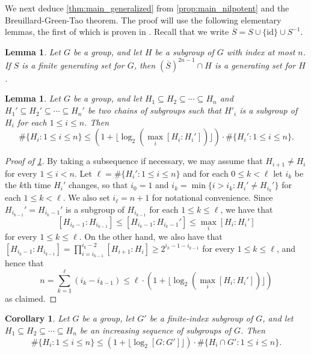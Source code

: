 \documentclass[11pt]{article}
\numberwithin{equation}{section}
\theoremstyle{plain}
\newtheorem{lemma}[thm]{Lemma}
\newtheorem{corollary}[thm]{Corollary}
\theoremstyle{definition}
\theoremstyle{remark}
\numberwithin{equation}{section}
\numberwithin{equation}{section}
\begin{document}
We next deduce \cref{thm:main_generalized} from \cref{prop:main_nilpotent} and the Breuillard-Green-Tao theorem.
The proof will use the following elementary lemmas, the first of which is proven in \cite[Lemma 4.2]{MR3439705}. Recall that we write $\overline{S}=S\cup\{\mathrm{id}\}\cup S^{-1}$.

\begin{lemma}
\label{lem:generating_finite_index}
Let $G$ be a group, and let $H$ be a subgroup of $G$ with index at most $n$. If $S$ is a finite generating set for $G$, then $(\overline{S})^{2n-1} \cap H$ is a generating set for $H$.
\end{lemma}

\begin{lemma}
\label{lem:finite_index_subgroup_chain}
Let $G$ be a group, and let $H_1 \subseteq H_2 \subseteq \cdots \subseteq H_n$ and $H_1' \subseteq H_2' \subseteq \cdots \subseteq H_n'$ be two chains of subgroups such that $H'_i$ is a subgroup of $H_i$ for each $1\leq i \leq n$. Then
\[
\#\{H_i:1\leq i \leq n\} \leq (1+\lfloor \log_2 (\max_i [H_i:H_i'])\rfloor) \cdot \#\{H_{i}' : 1 \leq i \leq n\}.
\]
\end{lemma}




\begin{proof}[Proof of \cref{lem:finite_index_subgroup_chain}]
By taking a subsequence if necessary, we may assume that $H_{i+1}\neq H_i$ for every $1\leq i < n$. 
Let $\ell=\#\{H_i' : 1 \leq i \leq n \}$ and for each $0\leq k<\ell$ let $i_k$ be the $k$th time $H_i'$ changes, so that $i_0=1$ and $i_k=\min \{i>i_k : H_i' \neq H_{i_k}'\}$ for each $1 \leq k < \ell$. We also set $i_\ell=n+1$ for notational convenience. Since $H_{i_{k-1}}'=H_{i_k-1}'$ is a subgroup of $H_{i_{k-1}}$ for each $1\leq k \leq \ell$, we have that
\[
[H_{i_k-1}:H_{i_{k-1}}] \leq [H_{i_k-1}:H_{i_k-1}'] \leq \max_i [H_i:H_i']
\]
for every $1\leq k \leq \ell$.
On the other hand, we also have that
$[H_{i_k-1}:H_{i_{k-1}}] = \prod_{i=i_{k-1}}^{i_k-2} [H_{i+1}:H_i] \geq 2^{i_k-1-i_{k-1}}$ for every $1\leq k \leq \ell$,
and hence that
\[
n = \sum_{k=1}^\ell (i_k-i_{k-1}) \leq \ell \cdot (1+\lfloor \log_2 (\max_i [H_i:H_i']) \rfloor)
\]
as claimed.
\end{proof}

\begin{corollary}
\label{cor:finite_index_subgroup_chain}
Let $G$ be a group, let $G'$ be a finite-index subgroup of $G$, and let $H_1 \subseteq H_2 \subseteq \cdots \subseteq H_n$ be an increasing sequence of subgroups of $G$. Then
\[
\#\{H_i:1\leq i \leq n\}  \leq (1+\lfloor \log_2[G:G'] \rfloor) \cdot \#\{H_i \cap G':1\leq i \leq n\} .
\]
\end{corollary}
\end{document}
